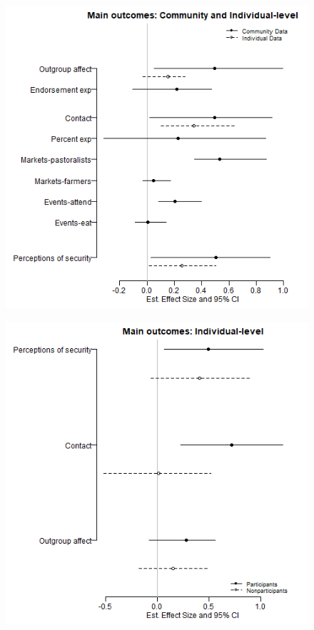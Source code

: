 \documentclass[]{article}
\begin{document}
\begin{figure}[!h]
    \begin{minipage}[b]{.48\textwidth}
        \includegraphics[width=\linewidth]{../figs/ecpn_coefplots_MainOuts-cats.png}
        \label{fig:fig1}
    \end{minipage}
    \hfill
    \begin{minipage}[b]{.48\textwidth}
        \includegraphics[width=\linewidth]{../figs/ecpn_coefplots_MainOuts_panel-cats.png}
        \label{fig:fig2}
    \end{minipage}
\end{figure}
\end{document}
